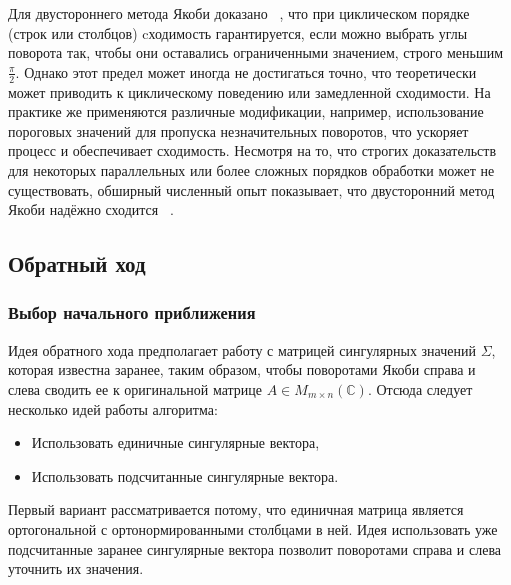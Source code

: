 Для двустороннего метода Якоби доказано ~\cite{Forsythe1960}, что при циклическом порядке (строк или столбцов) cходимость гарантируется, если можно выбрать углы поворота так, чтобы они оставались ограниченными значением, строго меньшим $\frac{\pi}{2}$. Однако этот предел может иногда не достигаться точно, что теоретически может приводить к циклическому поведению или замедленной сходимости. На практике же применяются различные модификации, например, использование пороговых значений для пропуска незначительных поворотов, что ускоряет процесс и обеспечивает сходимость. Несмотря на то, что строгих доказательств для некоторых параллельных или более сложных порядков обработки может не существовать, обширный численный опыт показывает, что двусторонний метод Якоби надёжно сходится ~\cite{Dongarra2018}.

\subsection{Обратный ход}

\subsubsection{Выбор начального приближения}
Идея обратного хода предполагает работу с матрицей сингулярных значений $\Sigma$, которая известна заранее, таким образом, чтобы поворотами Якоби справа и слева сводить ее к оригинальной матрице $A \in M_{m\times n}(\mathbb{C})$. Отсюда следует несколько идей работы алгоритма: 
\begin{itemize}
    \item Использовать единичные сингулярные вектора,
    \item Использовать подсчитанные сингулярные вектора.
\end{itemize}
Первый вариант рассматривается потому, что единичная матрица является ортогональной с ортонормированными столбцами в ней. 
Идея использовать уже подсчитанные заранее сингулярные вектора позволит поворотами справа и слева уточнить их значения. 

